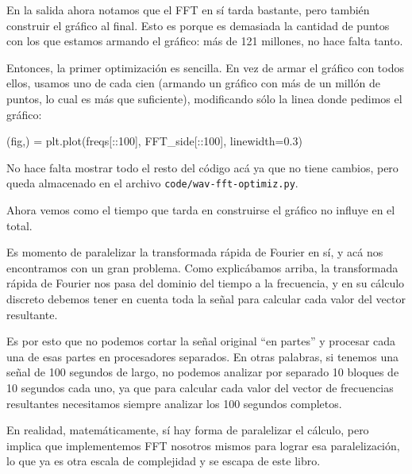 En la salida ahora notamos que el FFT en sí tarda bastante, pero también construir el gráfico al final. Esto es porque es demasiada la cantidad de puntos con los que estamos armando el gráfico: más de 121 millones, no hace falta tanto.

Entonces, la primer optimización es sencilla. En vez de armar el gráfico con todos ellos, usamos uno de cada cien (armando un gráfico con más de un millón de puntos, lo cual es más que suficiente), modificando sólo la linea donde pedimos el gráfico:

\begin{py}
    (fig,) = plt.plot(freqs[::100], FFT_side[::100], linewidth=0.3)
\end{py}

No hace falta mostrar todo el resto del código acá ya que no tiene cambios, pero queda almacenado en el archivo \texttt{code/wav-fft-optimiz.py}.


Ahora vemos como el tiempo que tarda en construirse el gráfico no influye en el total.

Es momento de paralelizar la transformada rápida de Fourier en sí, y acá nos encontramos con un gran problema. Como explicábamos arriba, la transformada rápida de Fourier nos pasa del dominio del tiempo a la frecuencia, y en su cálculo discreto debemos tener en cuenta toda la señal para calcular cada valor del vector resultante.

Es por esto que no podemos cortar la señal original ``en partes'' y procesar cada una de esas partes en procesadores separados. En otras palabras, si tenemos una señal de 100 segundos de largo, no podemos analizar por separado 10 bloques de 10 segundos cada uno, ya que para calcular cada valor del vector de frecuencias resultantes necesitamos siempre analizar los 100 segundos completos.

\begin{info}
En realidad, matemáticamente, sí hay forma de paralelizar el cálculo, pero implica que implementemos FFT nosotros mismos para lograr esa paralelización, lo que ya es otra escala de complejidad y se escapa de este libro.
\end{info}

